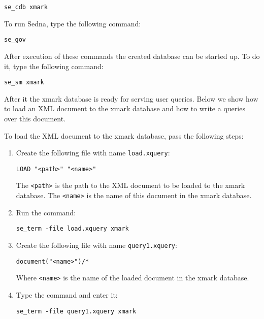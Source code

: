 \documentclass[a4paper,12pt]{article}
\begin{document}
\begin{verbatim}
se_cdb xmark
\end{verbatim}

To run Sedna, type the following command:

\begin{verbatim}
se_gov
\end{verbatim}

After execution of these commands the created database can be started up. To do it, type the following command:

\begin{verbatim}
se_sm xmark
\end{verbatim}

After it the xmark database is ready for serving user queries. Below we show how to load an XML document to the xmark database and how to write a queries over this document.

To load the XML document to the xmark database, pass the following steps:

\begin{enumerate}
\item Create the following file with name \verb!load.xquery!:

\begin{verbatim}
LOAD "<path>" "<name>"
\end{verbatim}

The \verb!<path>! is the path to the XML document to be loaded to the xmark database. The \verb!<name>! is the name of this document in the xmark database.

\item Run the command: 

\begin{verbatim}
se_term -file load.xquery xmark
\end{verbatim}

\item Create the following file with name \verb!query1.xquery!:

\begin{verbatim}
document("<name>")/*
\end{verbatim}

Where \verb!<name>! is the name of the loaded document in the xmark database.

\item Type the command and enter it:
\begin{verbatim}
se_term -file query1.xquery xmark
\end{verbatim}
\end{enumerate}
\end{document}
